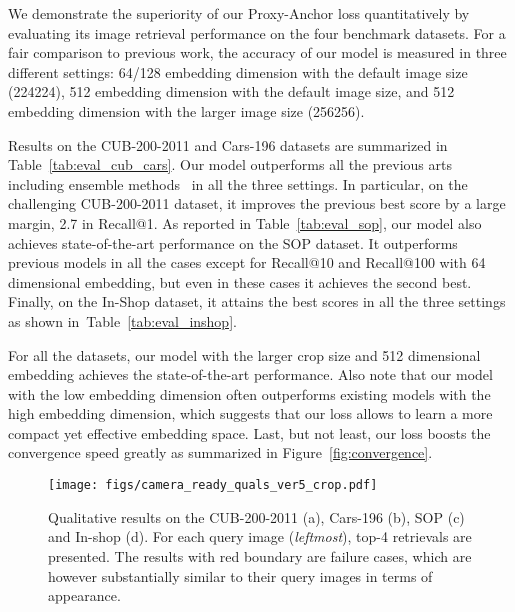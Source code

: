 \documentclass[10pt,twocolumn,letterpaper]{article}
\begin{document}
We demonstrate the superiority of our Proxy-Anchor loss quantitatively by evaluating its image retrieval performance on the four benchmark datasets. 
For a fair comparison to previous work, the accuracy of our model is measured in three different settings: 64/128 embedding dimension with the default image size (224224), 512 embedding dimension with the default image size, and 512 embedding dimension with the larger image size (256256).

Results on the CUB-200-2011 and Cars-196 datasets are summarized in Table~\ref{tab:eval_cub_cars}.
Our model outperforms all the previous arts including ensemble methods~\cite{opitz2018deep,ensemble_embedding} in all the three settings.  
In particular, on the challenging CUB-200-2011 dataset, it improves the previous best score by a large margin, 2.7 in Recall@1.
As reported in Table~\ref{tab:eval_sop}, our model also achieves state-of-the-art performance on the SOP dataset.
It outperforms previous models in all the cases except for Recall@10 and Recall@100 with 64 dimensional embedding, but even in these cases it achieves the second best.
Finally, on the In-Shop dataset, it attains the best scores in all the three settings as shown in~Table~\ref{tab:eval_inshop}. 

For all the datasets, our model with the larger crop size and 512 dimensional embedding achieves the state-of-the-art performance.
Also note that our model with the low embedding dimension often outperforms existing models with the high embedding dimension, which suggests that our loss allows to learn a more compact yet effective embedding space.
Last, but not least, our loss boosts the convergence speed greatly as summarized in Figure~\ref{fig:convergence}.













\begin{figure} [!t]
\centering
\texttt{[image: figs/camera\_ready\_quals\_ver5\_crop.pdf]}
\caption{Qualitative results on the CUB-200-2011 (a), Cars-196 (b), SOP (c) and In-shop (d). For each query image (\emph{leftmost}), top-4 retrievals are presented. 
The results with red boundary are failure cases, which are however substantially similar to their query images in terms of appearance.
}
\label{fig:qualitative_results}
\end{figure}
\end{document}

